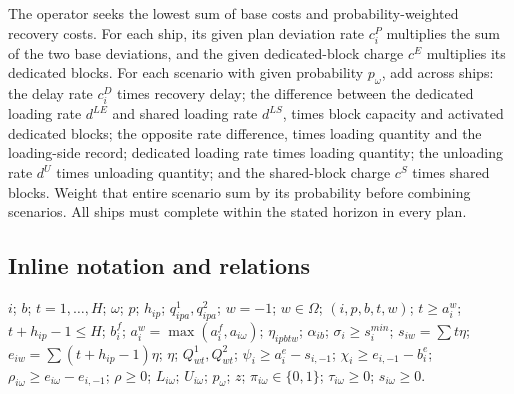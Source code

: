 \documentclass[10pt]{article}
\begin{document}
The operator seeks the lowest sum of base costs and probability-weighted recovery costs. For each ship, its given plan deviation rate $c_i^P$ multiplies the sum of the two base deviations, and the given dedicated-block charge $c^E$ multiplies its dedicated blocks. For each scenario with given probability $p_\omega$, add across ships: the delay rate $c_i^D$ times recovery delay; the difference between the dedicated loading rate $d^{LE}$ and shared loading rate $d^{LS}$, times block capacity and activated dedicated blocks; the opposite rate difference, times loading quantity and the loading-side record; dedicated loading rate times loading quantity; the unloading rate $d^U$ times unloading quantity; and the shared-block charge $c^S$ times shared blocks. Weight that entire scenario sum by its probability before combining scenarios. All ships must complete within the stated horizon in every plan.

\subsection*{Inline notation and relations}
$i$; $b$; $t=1,\ldots,H$; $\omega$; $p$; $h_{ip}$; $q^1_{ipa},q^2_{ipa}$; $w=-1$; $w\in\Omega$; $(i,p,b,t,w)$; $t\ge a_i^w$; $t+h_{ip}-1\le H$; $b_i^f$; $a_i^w=\max(a_i^f,a_{i\omega})$; $\eta_{ipbtw}$; $\alpha_{ib}$; $\sigma_i\ge s_i^{min}$; $s_{iw}=\sum t\eta$; $e_{iw}=\sum(t+h_{ip}-1)\eta$; $\eta$; $Q^1_{wt},Q^2_{wt}$; $\psi_i\ge a_i^e-s_{i,-1}$; $\chi_i\ge e_{i,-1}-b_i^e$; $\rho_{i\omega}\ge e_{i\omega}-e_{i,-1}$; $\rho\ge0$; $L_{i\omega}$; $U_{i\omega}$; $p_\omega$; $z$; $\pi_{i\omega}\in\{0,1\}$; $\tau_{i\omega}\ge0$; $s_{i\omega}\ge0$.
\end{document}
